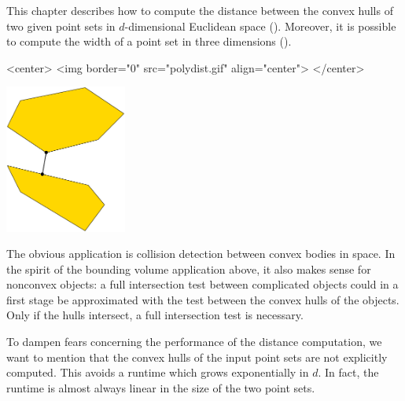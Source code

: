 

This chapter describes how to compute the distance between the convex
hulls of two given point sets in $d$-dimensional Euclidean space
(). Moreover, it is possible to
compute the width of a point set in three dimensions
().

\begin{ccHtmlOnly}
<center>
<img border="0" src="polydist.gif" align="center">
</center>
\end{ccHtmlOnly} 

\begin{ccTexOnly}
\begin{center}
\includegraphics[width=4cm]{Optimisation/polydist}
\end{center}
\end{ccTexOnly}

The obvious application is collision detection between convex bodies
in space. In the spirit of the bounding volume application above, it
also makes sense for nonconvex objects: a full intersection test
between complicated objects could in a first stage be approximated
with the test between the convex hulls of the objects. Only if the
hulls intersect, a full intersection test is necessary.

To dampen fears concerning the performance of the distance
computation, we want to mention that the convex hulls of the input
point sets are not explicitly computed. This avoids a runtime which
grows exponentially in $d$. In fact, the runtime is almost always
linear in the size of the two point sets.

